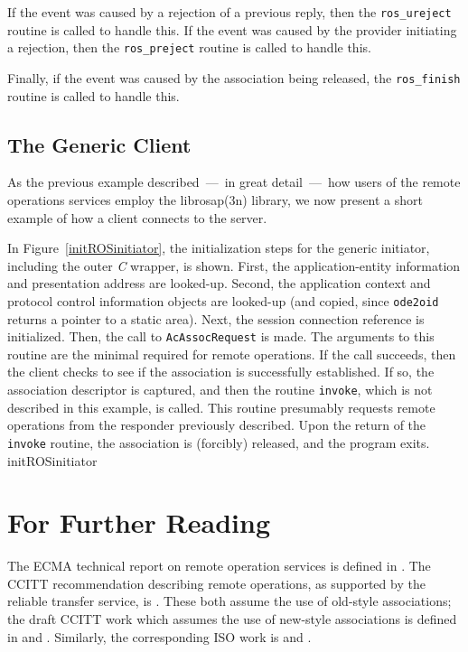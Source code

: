 If the event was caused by a rejection of a previous reply,
then the \verb"ros_ureject" routine is called to handle this.
If the event was caused by the provider initiating a rejection,
then the \verb"ros_preject" routine is called to handle this.

Finally,
if the event was caused by the association being released,
the \verb"ros_finish" routine is called to handle this.

\subsection	{The Generic Client}
As the previous example described~---~in great detail~---~how users of the
remote operations services employ the \man librosap(3n) library,
we now present a short example of how a client connects to the server.

In Figure~\ref{initROSinitiator},
the initialization steps for the generic initiator,
including the outer {\em C\/} wrapper,
is shown.
First, the application-entity information and presentation address are
looked-up.
Second, the application context and protocol control information objects are
looked-up
(and copied, since \verb"ode2oid" returns a pointer to a static area).
Next, the session connection reference is initialized.
Then, the call to \verb"AcAssocRequest" is made.
The arguments to this routine are the minimal required for remote operations.
If the call succeeds,
then the client checks to see if the association is successfully established.
If so, the association descriptor is captured, and then the routine
\verb"invoke",
which is not described in this example,
is called.
This routine presumably requests remote operations from the responder
previously described.
Upon the return of the \verb"invoke" routine,
the association is (forcibly) released,
and the program exits.
{\let\small=\scriptsize			%
\clearpage
{}%
	{initROSinitiator}
\clearpage
{}%
	\empty}

\section       {For Further Reading}\label{ros:reading}
The ECMA technical report on remote operation services is defined in
\cite{ECMA.ROS}.
The CCITT recommendation describing remote operations,
as supported by the reliable transfer service,
is \cite{MHS.RTS}.
These both assume the use of old-style associations;
the draft CCITT work which assumes the use of new-style associations is
defined in \cite{CCITT.ROS.Service} and \cite{CCITT.ROS.Protocol}.
Similarly,
the corresponding ISO work is
\cite{ISO.ROS.Service} and \cite{ISO.ROS.Protocol}.


